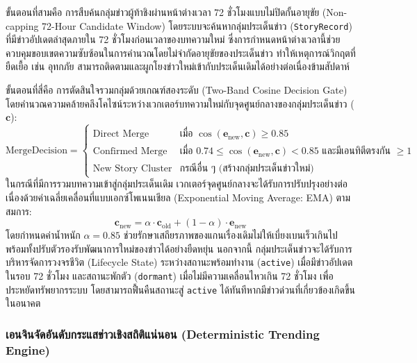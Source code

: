 ขั้นตอนที่สามคือ การสืบค้นกลุ่มข่าวผู้ท้าชิงผ่านหน้าต่างเวลา 72 ชั่วโมงแบบไม่ปิดกั้นอายุขัย (Non-capping 72-Hour Candidate Window) โดยระบบจะค้นหากลุ่มประเด็นข่าว (\texttt{StoryRecord}) ที่มีข่าวอัปเดตล่าสุดภายใน 72 ชั่วโมงก่อนเวลาของบทความใหม่ ซึ่งการกำหนดหน้าต่างเวลานี้ช่วยควบคุมขอบเขตความซับซ้อนในการคำนวณโดยไม่จำกัดอายุขัยของประเด็นข่าว ทำให้เหตุการณ์วิกฤตที่ยืดเยื้อ เช่น อุทกภัย สามารถติดตามและผูกโยงข่าวใหม่เข้ากับประเด็นเดิมได้อย่างต่อเนื่องข้ามสัปดาห์

ขั้นตอนที่สี่คือ การตัดสินใจรวมกลุ่มด้วยเกณฑ์สองระดับ (Two-Band Cosine Decision Gate) โดยคำนวณความคล้ายคลึงโคไซน์ระหว่างเวกเตอร์บทความใหม่กับจุดศูนย์กลางของกลุ่มประเด็นข่าว ($\mathbf{c}$):
\begin{equation}
\text{MergeDecision} = \begin{cases} 
\text{Direct Merge} & \text{เมื่อ } \cos(\mathbf{e}_{\text{new}}, \mathbf{c}) \ge 0.85 \\
\text{Confirmed Merge} & \text{เมื่อ } 0.74 \le \cos(\mathbf{e}_{\text{new}}, \mathbf{c}) < 0.85 \text{ และมีเอนทิตีตรงกัน } \ge 1 \\
\text{New Story Cluster} & \text{กรณีอื่น ๆ (สร้างกลุ่มประเด็นข่าวใหม่)}
\end{cases}
\end{equation}
ในกรณีที่มีการรวมบทความเข้าสู่กลุ่มประเด็นเดิม เวกเตอร์จุดศูนย์กลางจะได้รับการปรับปรุงอย่างต่อเนื่องด้วยค่าเฉลี่ยเคลื่อนที่แบบเอกซ์โพเนนเชียล (Exponential Moving Average: EMA) ตามสมการ:
\begin{equation}
\mathbf{c}_{\text{new}} = \alpha \cdot \mathbf{c}_{\text{old}} + (1 - \alpha) \cdot \mathbf{e}_{\text{new}}
\end{equation}
โดยกำหนดค่าน้ำหนัก $\alpha = 0.85$ ช่วยรักษาเสถียรภาพของแกนเรื่องเดิมไม่ให้เบี่ยงเบนเร็วเกินไป พร้อมทั้งปรับตัวรองรับพัฒนาการใหม่ของข่าวได้อย่างยืดหยุ่น นอกจากนี้ กลุ่มประเด็นข่าวจะได้รับการบริหารจัดการวงจรชีวิต (Lifecycle State) ระหว่างสถานะพร้อมทำงาน (\texttt{active}) เมื่อมีข่าวอัปเดตในรอบ 72 ชั่วโมง และสถานะพักตัว (\texttt{dormant}) เมื่อไม่มีความเคลื่อนไหวเกิน 72 ชั่วโมง เพื่อประหยัดทรัพยากรระบบ โดยสามารถฟื้นคืนสถานะสู่ \texttt{active} ได้ทันทีหากมีข่าวด่วนที่เกี่ยวข้องเกิดขึ้นในอนาคต

\subsubsection{เอนจินจัดอันดับกระแสข่าวเชิงสถิติแน่นอน (Deterministic Trending Engine)}

